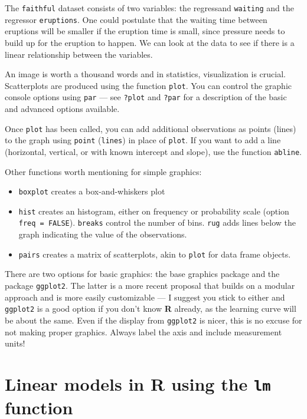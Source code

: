 \documentclass[
  11pt,
  letterpaper,
]{book}
\makeatletter
\providecommand{\tightlist}{%
  \setlength{\itemsep}{0pt}\setlength{\parskip}{0pt}}
\newenvironment{kframe}{%
\medskip{}
\setlength{\fboxsep}{.8em}
 \def\at@end@of@kframe{}%
 \ifinner\ifhmode%
  \def\at@end@of@kframe{\end{minipage}}%
  \begin{minipage}{\columnwidth}%
 \fi\fi%
 \def\FrameCommand##1{\hskip\@totalleftmargin \hskip-\fboxsep
 \colorbox{shadecolor}{##1}\hskip-\fboxsep
     \hskip-\linewidth \hskip-\@totalleftmargin \hskip\columnwidth}%
 \MakeFramed {\advance\hsize-\width
   \@totalleftmargin\z@ \linewidth\hsize
   \@setminipage}}%
 {\par\unskip\endMakeFramed%
 \at@end@of@kframe}
\newenvironment{rmdblock}[1]
  {
  \begin{itemize}
  \renewcommand{\labelitemi}{
    \raisebox{-.7\height}[0pt][0pt]{
      {\setkeys{Gin}{width=3em,keepaspectratio}\texttt{[image: images/\#1]}}
    }
  }
  \setlength{\fboxsep}{1em}
  \begin{kframe}
  \item
  }
  {
  \end{kframe}
  \end{itemize}
  }
\newenvironment{rmdnote}
  {\begin{rmdblock}{note}}
  {\end{rmdblock}}
\theoremstyle{definition}
\theoremstyle{definition}
\theoremstyle{definition}
\theoremstyle{remark}
\makeatother
\begin{document}
The \texttt{faithful} dataset consists of two variables: the regressand \texttt{waiting} and the regressor \texttt{eruptions}. One could postulate that the waiting time between eruptions will be smaller if the eruption time is small, since pressure needs to build up for the eruption to happen. We can look at the data to see if there is a linear relationship between the variables.

An image is worth a thousand words and in statistics, visualization is crucial. Scatterplots are produced using the function \texttt{plot}. You can control the graphic console options using \texttt{par} --- see \texttt{?plot} and \texttt{?par} for a description of the basic and advanced options available.

Once \texttt{plot} has been called, you can add additional observations as points (lines) to the graph using \texttt{point} (\texttt{lines}) in place of \texttt{plot}. If you want to add a line (horizontal, vertical, or with known intercept and slope), use the function \texttt{abline}.

Other functions worth mentioning for simple graphics:

\begin{itemize}
\tightlist
\item
  \texttt{boxplot} creates a box-and-whiskers plot
\item
  \texttt{hist} creates an histogram, either on frequency or probability scale (option \texttt{freq\ =\ FALSE}). \texttt{breaks} control the number of bins. \texttt{rug} adds lines below the graph indicating the value of the observations.
\item
  \texttt{pairs} creates a matrix of scatterplots, akin to \texttt{plot} for data frame objects.
\end{itemize}

\begin{rmdnote}
There are two options for basic graphics: the base graphics package and the package \texttt{ggplot2}. The latter is a more recent proposal that builds on a modular approach and is more easily customizable --- I suggest you stick to either and \texttt{ggplot2} is a good option if you don't know \textbf{R} already, as the learning curve will be about the same. Even if the display from \texttt{ggplot2} is nicer, this is no excuse for not making proper graphics. Always label the axis and include measurement units!
\end{rmdnote}

\hypertarget{rlmfunc}{%
\section{\texorpdfstring{Linear models in \textbf{R} using the \texttt{lm} function}{Linear models in R using the lm function}}\label{rlmfunc}}
\end{document}
